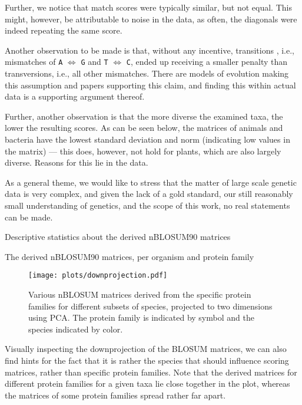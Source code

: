 \documentclass{article}
\begin{document}
	Further, we notice that match scores were typically similar, but not equal. This might, however, be attributable to noise in the data, as often, the diagonals were indeed repeating the same score. 

	Another observation to be made is that, without any incentive, transitions
	, i.e., mismatches of \texttt{A} $\iff$ \texttt{G} and \texttt{T}
	$\iff$ \texttt{C}, ended up receiving a smaller penalty than
	transversions, i.e., all other mismatches. There are models of
	evolution making this assumption and papers supporting this claim, and
	finding this within actual data is a supporting argument thereof.

	Further, another observation is that the more diverse the examined taxa,
	the lower the resulting scores. As can be seen below,
	the matrices of animals and bacteria have the lowest standard deviation and norm (indicating low values in the matrix) --- this does, however, not hold for plants, which are also largely diverse. Reasons for this lie in the data.
	
As a general theme, we would like to stress that the matter of large scale genetic data is very complex, and given the lack of a gold standard, our still reasonably small understanding of genetics, and the scope of this work, no real statements can be made.
	\begin{table}[h] \label{desctable}
		
		\caption{Descriptive statistics about the derived nBLOSUM90 matrices}
	\end{table}

	\begin{table}
	
	\caption{The derived nBLOSUM90 matrices, per organism and protein family}
	\end{table}

\onecolumn
\pagebreak

\begin{figure}[!htp]
		\centering
		\texttt{[image: plots/downprojection.pdf]}
		\caption{Various nBLOSUM matrices derived from the specific protein families for different subsets of species, projected to two dimensions using PCA. The protein family is indicated by symbol and the species indicated by color.}
	\end{figure}
Visually inspecting the downprojection of the BLOSUM matrices, we can also find
hints for the fact that it is rather the species that should influence scoring
matrices, rather than specific protein families. Note that the derived matrices
for different protein families for a given taxa lie close together in the plot,
whereas the matrices of some protein families spread rather far apart. 
\end{document}
